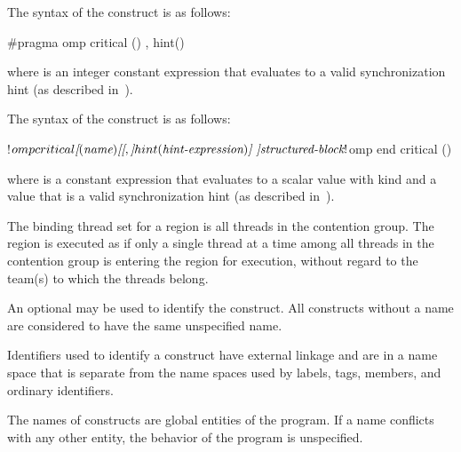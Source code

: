 \syntax
\begin{ccppspecific}
The syntax of the  construct is as follows:

\begin{ompcPragma}
  #pragma omp critical \plc{[}() \plc{[[},\plc{]} hint()\plc{] ] new-line}
\end{ompcPragma}

where  is an integer constant expression that
evaluates to a valid synchronization hint (as described in~).
\end{ccppspecific}

\begin{fortranspecific}
The syntax of the  construct is as follows:

\begin{ompfPragma}
!$omp critical \plc{[}(\plc{name}) \plc{[[},\plc{]} hint(\plc{hint-expression})\plc{] ]}
    \plc{structured-block}
!$omp end critical \plc{[}()\plc{]}
\end{ompfPragma}

where  is a constant expression that evaluates to
a scalar value with kind  and  a value
that is a valid synchronization hint (as described
in~).
\end{fortranspecific}

\binding
The binding thread set for a  region is all threads in the contention group.
The region is executed as if only a single thread at a time among all threads in the
contention group is entering the region for execution, without regard to the team(s) to which the threads belong.

\descr
An optional  may be used to identify the  construct. All 
constructs without a name are considered to have the same unspecified name.

\begin{ccppspecific}
Identifiers used to identify a  construct have external linkage and are in a
name space that is separate from the name spaces used by labels, tags, members, and
ordinary identifiers.
\end{ccppspecific}

\begin{fortranspecific}
The names of  constructs are global entities of the program. If a name
conflicts with any other entity, the behavior of the program is unspecified.
\end{fortranspecific}

